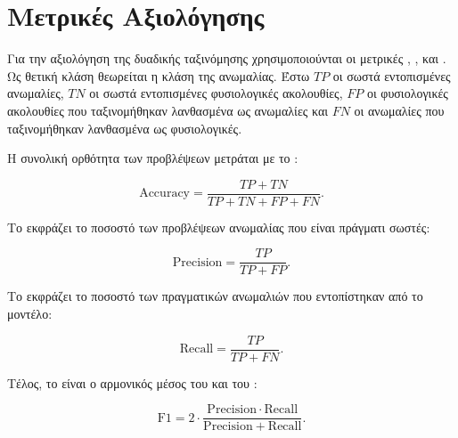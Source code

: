 \section{Μετρικές Αξιολόγησης}

Για την αξιολόγηση της δυαδικής ταξινόμησης χρησιμοποιούνται οι μετρικές , ,  και . Ως θετική κλάση θεωρείται η κλάση της ανωμαλίας. Έστω \(TP\) οι σωστά εντοπισμένες ανωμαλίες, \(TN\) οι σωστά εντοπισμένες φυσιολογικές ακολουθίες, \(FP\) οι φυσιολογικές ακολουθίες που ταξινομήθηκαν λανθασμένα ως ανωμαλίες και \(FN\) οι ανωμαλίες που ταξινομήθηκαν λανθασμένα ως φυσιολογικές.

Η συνολική ορθότητα των προβλέψεων μετράται με το :

\[
\mathrm{Accuracy}
=
\frac{TP + TN}{TP + TN + FP + FN}.
\]

Το  εκφράζει το ποσοστό των προβλέψεων ανωμαλίας που είναι πράγματι σωστές:

\[
\mathrm{Precision}
=
\frac{TP}{TP + FP}.
\]

Το  εκφράζει το ποσοστό των πραγματικών ανωμαλιών που εντοπίστηκαν από το μοντέλο:

\[
\mathrm{Recall}
=
\frac{TP}{TP + FN}.
\]

Τέλος, το  είναι ο αρμονικός μέσος του  και του :

\[
\mathrm{F1}
=
2 \cdot
\frac{\mathrm{Precision} \cdot \mathrm{Recall}}
{\mathrm{Precision} + \mathrm{Recall}}.
\]
